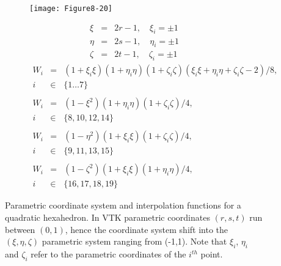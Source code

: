 \begin{description}[leftmargin=0cm,labelindent=0cm]
    \begin{figure}[!htb]
        \centering
        \begin{subfigure}{0.48\linewidth}
            \centering
            \texttt{[image: Figure8-20]}
            \caption*{}
        \end{subfigure}
        \hfill
        \begin{subfigure}{0.48\linewidth}
            \begin{equation*}
            \begin{array}{lll}
            \xi &=& 2r  - 1,\quad \xi_i = \pm1 \\
            \eta &=& 2 s - 1,\quad \eta_i = \pm1 \\
            \zeta &=& 2 t - 1,\quad \zeta_i = \pm1
            \end{array}
            \end{equation*}
            \begin{equation*}
            \begin{array}{lll}
            W_i &=& (1 + \xi_i \xi)(1 + \eta_i \eta)(1 + \zeta_i \zeta)(\xi_i \xi + \eta_i \eta + \zeta_i \zeta - 2)/8, \\
            i &\in& \lbrace 1 \ldots 7 \rbrace \\ \\
            W_i &=& (1 - \xi^2)(1 + \eta_i \eta)(1 + \zeta_i \zeta)/4, \\
            i &\in& \lbrace 8, 10, 12, 14 \rbrace \\ \\
            W_i &=& (1 - \eta^2)(1 + \xi_i \xi)(1 + \zeta_i \zeta)/4, \\
            i &\in& \lbrace 9, 11, 13, 15 \rbrace \\ \\
            W_i &=& (1 - \zeta^2)(1 + \xi_i \xi)(1 + \eta_i \eta)/4, \\
            i &\in& \lbrace 16, 17, 18, 19 \rbrace
            \end{array}
            \end{equation*}
        \end{subfigure}%
        \caption{Parametric coordinate system and interpolation functions for a quadratic hexahedron. In VTK parametric coordinates $(r,s,t)$ run between $(0,1)$, hence the coordinate system shift into the $(\xi, \eta, \zeta)$ parametric system ranging from (-1,1). Note that $\xi_i$, $\eta_i$ and $\zeta_i$ refer to the parametric coordinates of the $i^{th}$ point.}
        \label{fig:Figure8-20}
    \end{figure}


\end{description}
